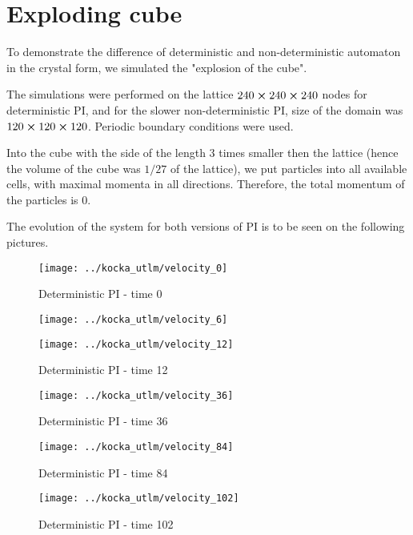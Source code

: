 \section{Exploding cube}
To demonstrate the difference of deterministic and non-deterministic automaton in the crystal form, we simulated the "explosion of the cube". 

The simulations were performed on the lattice $240 \cross 240 \cross 240$ nodes for deterministic PI, and for the slower non-deterministic PI, size of the domain was $120 \cross 120 \cross 120$. Periodic boundary conditions were used.

Into the cube with the side of the length 3 times smaller then the lattice (hence the volume of the cube was $1/27$ of the lattice), we put particles into all available cells, with maximal momenta in all directions. Therefore, the total momentum of the particles is 0.

The evolution of the system for both versions of PI is to be seen on the following pictures.

\begin{figure}[h]
 \centering 
 \texttt{[image: ../kocka\_utlm/velocity\_0]}
 \caption{Deterministic PI - time 0}
\end{figure}

\begin{figure}[h]
 \centering 
 \texttt{[image: ../kocka\_utlm/velocity\_6]}

\end{figure}

\begin{figure}[h]
 \centering 
 \texttt{[image: ../kocka\_utlm/velocity\_12]}
 \caption{Deterministic PI - time 12}
\end{figure}

\begin{figure}[h]
 \centering 
 \texttt{[image: ../kocka\_utlm/velocity\_36]}
 \caption{Deterministic PI - time 36}
\end{figure}

\begin{figure}[h]
 \centering 
 \texttt{[image: ../kocka\_utlm/velocity\_84]}
 \caption{Deterministic PI - time 84}
\end{figure}

\begin{figure}[h]
 \centering 
 \texttt{[image: ../kocka\_utlm/velocity\_102]}
 \caption{Deterministic PI - time 102}
\end{figure}

